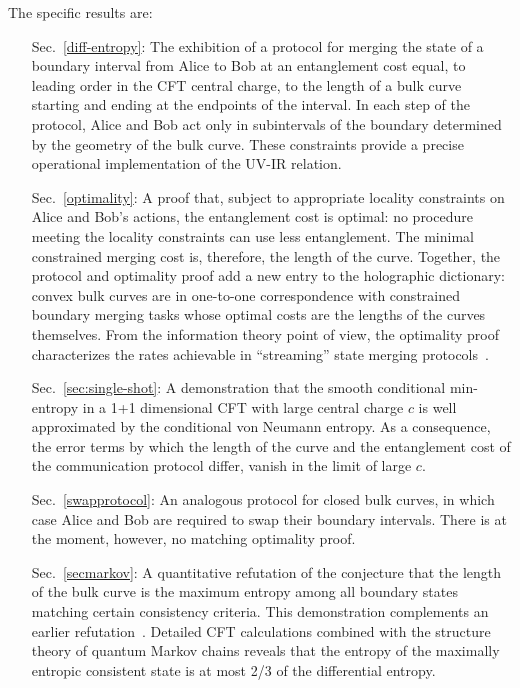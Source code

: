 \documentclass[12pt]{article}
\begin{document}
The specific results are:
\begin{enumerate}
\item[Sec.~\ref{diff-entropy}:] The exhibition of a protocol for merging the state of a boundary interval from Alice to Bob at an entanglement cost equal, to leading order in the CFT central charge, to the length of a bulk curve starting and ending at the endpoints of the interval. In each step of the protocol, Alice and Bob act only in subintervals of the boundary determined by the geometry of the bulk curve. These constraints provide a precise operational implementation of the UV-IR relation.
\item[Sec.~\ref{optimality}:] A proof that, subject to appropriate locality constraints on Alice and Bob's actions, the entanglement cost is optimal: no procedure meeting the locality constraints can use less entanglement. The minimal constrained merging cost is, therefore, the length of the curve. Together, the protocol and optimality proof add a new entry to the holographic dictionary: convex bulk curves are in one-to-one correspondence with constrained boundary merging tasks whose optimal costs are the lengths of the curves themselves. From the information theory point of view, the optimality proof characterizes the rates achievable in ``streaming'' state merging protocols~\cite{blume2009streaming}.
\item[Sec.~\ref{sec:single-shot}:] A demonstration that the smooth conditional min-entropy in a 1+1 dimensional CFT with large central charge $c$ is well approximated by the conditional von Neumann entropy. As a consequence, the error terms by which the length of the curve and the entanglement cost of the communication protocol differ, vanish in the limit of large $c$.
\item[Sec.~\ref{swapprotocol}:] An analogous protocol for closed bulk curves, in which case Alice and Bob are required to swap their boundary intervals. There is at the moment, however, no matching optimality proof.
\item[Sec.~\ref{secmarkov}:] A quantitative refutation of the conjecture that the length of the bulk curve is the maximum entropy among all boundary states matching certain consistency criteria. This demonstration complements an earlier refutation~\cite{swingle-kim}. Detailed CFT calculations combined with the structure theory of quantum Markov chains reveals that the entropy of the maximally entropic consistent state is at most 2/3 of the differential entropy.
\end{enumerate}
\end{document}

